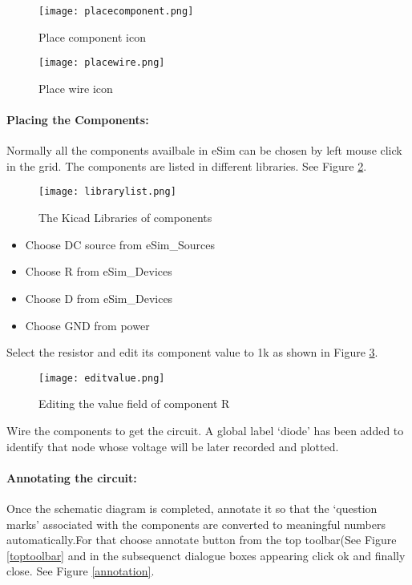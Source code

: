 \begin{figure}[H]
\begin{minipage}{.5\textwidth}
  \centering
  \texttt{[image: placecomponent.png]}
  \caption{Place component icon}
  \label{placecomponent}
\end{minipage}%
\begin{minipage}{.5\textwidth}
  \centering
  \texttt{[image: placewire.png]}
  \caption{Place wire icon}
  \label{placewire}
\end{minipage}
\end{figure}


\paragraph{Placing the Components:} Normally all the components availbale in eSim can be chosen by left mouse click in the grid. The components are listed in different libraries. See Figure \ref{librarylist}.

\begin{figure}[H]
\centering
\texttt{[image: librarylist.png]}
\caption{The Kicad Libraries of components}
\label{librarylist}
\end{figure}

\begin{itemize}
\item
Choose DC source from eSim\_Sources
\item
Choose R from eSim\_Devices
\item
Choose D from eSim\_Devices
\item
Choose GND from power
\end{itemize}

Select the resistor and edit its component value to 1k as shown in Figure \ref{editvalue}.

\begin{figure}[H]
\centering
\texttt{[image: editvalue.png]}
\caption{Editing the value field of component R}
\label{editvalue}
\end{figure}

Wire the components to get the circuit. A global label `diode' has been added to identify that node whose voltage will be later recorded and plotted.

\paragraph{Annotating the circuit:} Once the schematic diagram is completed, annotate it so that the `question marks' associated with the components are converted to meaningful numbers automatically.For that choose annotate button from the top toolbar(See Figure \ref{toptoolbar} and in the subsequenct dialogue boxes appearing click ok and finally close. See Figure \ref{annotation}.

